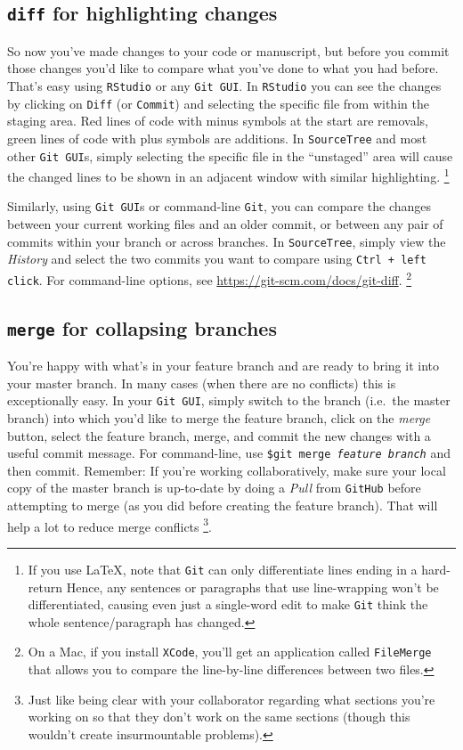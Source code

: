 \documentclass[12pt,letterpaper]{article}
\begin{document}
\subsection{\texttt{diff} for highlighting changes}
So now you've made changes to your code or manuscript, 
but before you commit those changes you'd like to compare what you've done 
to what you had before.
That's easy using \texttt{RStudio} or any \texttt{Git GUI}.
In \texttt{RStudio} you can see the changes by clicking on \texttt{Diff}
(or \texttt{Commit}) and selecting the specific file from within the staging area.
Red lines of code with minus symbols at the start are removals, 
green lines of code with plus symbols are additions.
In \texttt{SourceTree} and most other \texttt{Git GUI}s, 
simply selecting the specific file in the ``unstaged'' area will cause the changed 
lines to be shown in an adjacent window with similar highlighting.
\unskip
\footnote{If you use  \LaTeX, 
	note that \texttt{Git} can only differentiate lines ending in a hard-return
	Hence, any sentences or paragraphs that use line-wrapping won't be
	differentiated, causing even just a single-word edit to make \texttt{Git} think 
	the whole sentence/paragraph has changed.}

Similarly, using \texttt{Git GUI}s or command-line \texttt{Git}, you can compare 
the changes between your current working files and an older commit, 
or between any pair of commits within your branch or across branches.
In \texttt{SourceTree}, simply view the \emph{History} and select the two commits you want to compare using \texttt{Ctrl + left click}.
For command-line options, see \url{https://git-scm.com/docs/git-diff}.
\unskip
\footnote{
On a Mac, if you install \texttt{XCode}, you'll get an application called \texttt{FileMerge} that allows you to compare the line-by-line differences between two files.}

\subsection{\texttt{merge} for collapsing branches}

You're happy with what's in your feature branch and are ready to bring it into your master branch.
In many cases (when there are no conflicts) this is exceptionally easy.
In your \texttt{Git GUI}, simply switch to the branch (i.e.~the master branch) into 
which you'd like to merge the feature branch, 
click on the \emph{merge} button, 
select the feature branch, 
merge, and commit the new changes with a useful commit message.
For command-line, 
use \texttt{\$git merge \emph{feature branch}} and then commit.
Remember:  If you're working collaboratively, make sure your local copy of the master branch is up-to-date by doing a \emph{Pull} from \texttt{GitHub} before attempting to merge (as you did before creating the feature branch).
That will help a lot to reduce merge conflicts
\unskip
\footnote{Just like being clear with your collaborator regarding what sections
	 you're working on so that they don't work on the same sections
	 (though this wouldn't create insurmountable problems).}.
\end{document}
